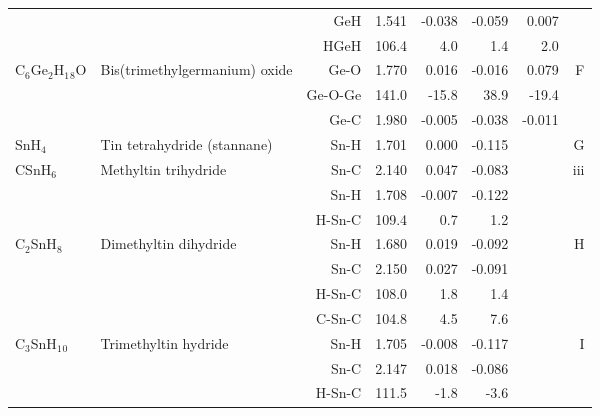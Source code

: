 \begin{table}
\begin{center}
\begin{tabular}{llrrrrrr}
             &                                    &GeH            &     1.541   &    -0.038 &    -0.059 &     0.007 &       \\
             &                                    &HGeH         &     106.4   &       4.0 &       1.4 &       2.0   &       \\
 C$_6$Ge$_2$H$_1$$_8$O   & Bis(trimethylgermanium) oxide      &Ge-O           &     1.770   &     0.016 &    -0.016 &     0.079 &     F \\
             &                                    &Ge-O-Ge      &     141.0   &     -15.8 &      38.9 &     -19.4   &       \\
             &                                    &Ge-C           &     1.980   &    -0.005 &    -0.038 &    -0.011 &       \\
 SnH$_4$        & Tin tetrahydride (stannane)        &Sn-H           &     1.701   &     0.000 &    -0.115 &  &     G \\
 CSnH$_6$       & Methyltin trihydride               &Sn-C           &     2.140   &     0.047 &    -0.083 &  &   iii \\
             &                                    &Sn-H           &     1.708   &    -0.007 &    -0.122 &  &       \\
             &                                    &H-Sn-C       &     109.4   &       0.7 &       1.2 &    &       \\
 C$_2$SnH$_8$      & Dimethyltin dihydride              &Sn-H           &     1.680   &     0.019 &    -0.092 &  &     H \\
             &                                    &Sn-C           &     2.150   &     0.027 &    -0.091 &  &       \\
             &                                    &H-Sn-C       &     108.0   &       1.8 &       1.4 &    &       \\
             &                                    &C-Sn-C       &     104.8   &       4.5 &       7.6 &    &       \\
 C$_3$SnH$_1$$_0$     & Trimethyltin hydride               &Sn-H           &     1.705   &    -0.008 &    -0.117 &  &     I \\
             &                                    &Sn-C           &     2.147   &     0.018 &    -0.086 &  &       \\
             &                                    &H-Sn-C       &     111.5   &      -1.8 &      -3.6 &    &       \\

\end{tabular}
\end{center}
\end{table}
